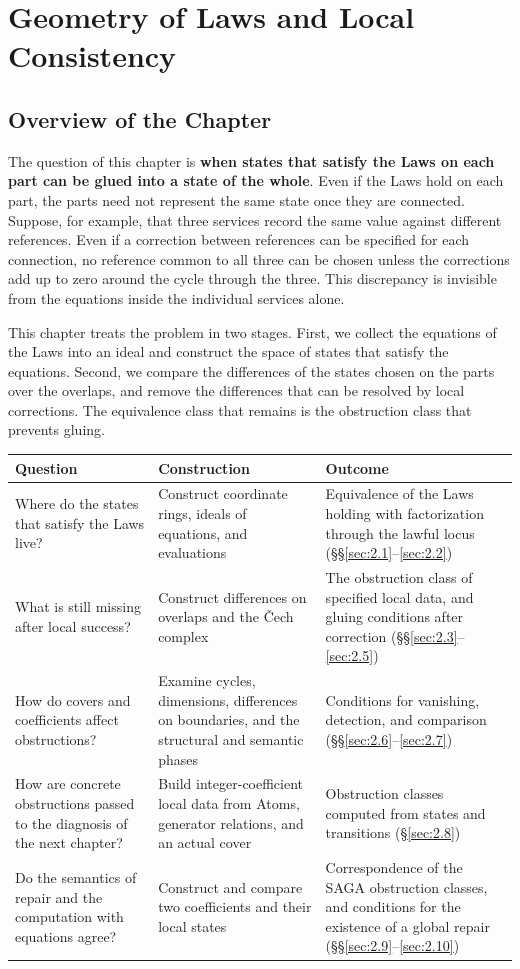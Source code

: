\chapter{Geometry of Laws and Local Consistency}\label{chap:2}

\section*{Overview of the Chapter}

The question of this chapter is \textbf{when states that satisfy the Laws on each part can
be glued into a state of the whole}. Even if the Laws hold on each part, the parts need not
represent the same state once they are connected. Suppose, for example, that three services
record the same value against different references. Even if a correction between references
can be specified for each connection, no reference common to all three can be chosen unless
the corrections add up to zero around the cycle through the three. This discrepancy is
invisible from the equations inside the individual services alone.

This chapter treats the problem in two stages. First, we collect the equations of the Laws
into an ideal and construct the space of states that satisfy the equations. Second, we
compare the differences of the states chosen on the parts over the overlaps, and remove the
differences that can be resolved by local corrections. The equivalence class that remains
is the obstruction class that prevents gluing.

\begin{xltabular}{\linewidth}{@{}LLL@{}}
\toprule
Question & Construction & Outcome \\
\midrule
\endhead
Where do the states that satisfy the Laws live? & Construct coordinate rings, ideals of equations, and evaluations & Equivalence of the Laws holding with factorization through the lawful locus (\S\S\ref{sec:2.1}--\ref{sec:2.2}) \\
\addlinespace[3pt]
What is still missing after local success? & Construct differences on overlaps and the \v{C}ech complex & The obstruction class of specified local data, and gluing conditions after correction (\S\S\ref{sec:2.3}--\ref{sec:2.5}) \\
\addlinespace[3pt]
How do covers and coefficients affect obstructions? & Examine cycles, dimensions, differences on boundaries, and the structural and semantic phases & Conditions for vanishing, detection, and comparison (\S\S\ref{sec:2.6}--\ref{sec:2.7}) \\
\addlinespace[3pt]
How are concrete obstructions passed to the diagnosis of the next chapter? & Build integer-coefficient local data from Atoms, generator relations, and an actual cover & Obstruction classes computed from states and transitions (\S\ref{sec:2.8}) \\
\addlinespace[3pt]
Do the semantics of repair and the computation with equations agree? & Construct and compare two coefficients and their local states & Correspondence of the SAGA obstruction classes, and conditions for the existence of a global repair (\S\S\ref{sec:2.9}--\ref{sec:2.10}) \\
\bottomrule
\end{xltabular}

